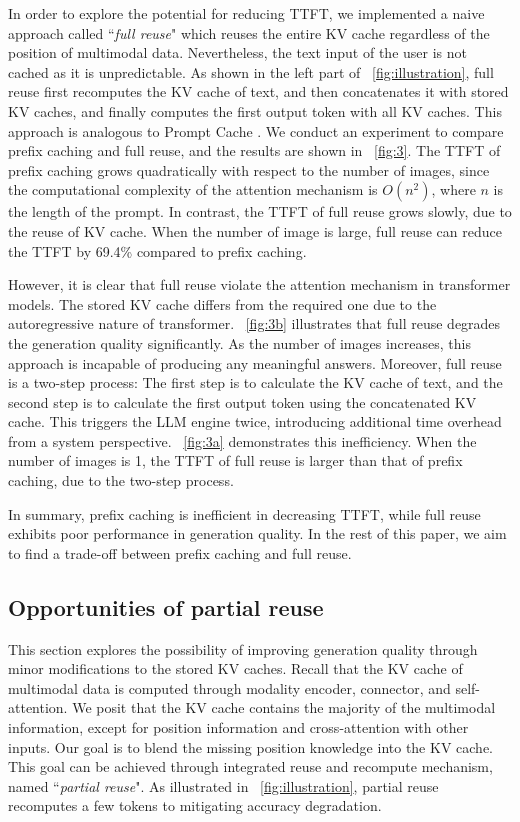 In order to explore the potential for reducing TTFT, we implemented a naive approach called ``\textit{full reuse}" which reuses the entire KV cache regardless of the position of multimodal data. Nevertheless, the text input of the user is not cached as it is unpredictable. As shown in the left part of \figurename~\ref{fig:illustration}, full reuse first recomputes the KV cache of text, and then concatenates it with stored KV caches, and finally computes the first output token with all KV caches. This approach is analogous to Prompt Cache \cite{gim2024prompt}. We conduct an experiment to compare prefix caching and full reuse, and the results are shown in \figurename~\ref{fig:3}. The TTFT of prefix caching grows quadratically with respect to the number of images, since the computational complexity of the attention mechanism is $O(n^2)$, where $n$ is the length of the prompt. In contrast, the TTFT of full reuse grows slowly, due to the reuse of KV cache. When the number of image is large, full reuse can reduce the TTFT by 69.4\% compared to prefix caching.

However, it is clear that full reuse violate the attention mechanism in transformer models. The stored KV cache differs from the required one due to the autoregressive nature of transformer. \figurename~\ref{fig:3b} illustrates that full reuse degrades the generation quality significantly. As the number of images increases, this approach is incapable of producing any meaningful answers. Moreover, full reuse is a two-step process: The first step is to calculate the KV cache of text, and the second step is to calculate the first output token using the concatenated KV cache. This triggers the LLM engine twice, introducing additional time overhead from a system perspective. \figurename~\ref{fig:3a} demonstrates this inefficiency. When the number of images is 1, the TTFT of full reuse is larger than that of prefix caching, due to the two-step process.

In summary, prefix caching is inefficient in decreasing TTFT, while full reuse exhibits poor performance in generation quality. In the rest of this paper, we aim to find a trade-off between prefix caching and full reuse.
\subsection{Opportunities of partial reuse}\label{sec:moti}
This section explores the possibility of improving generation quality through minor modifications to the stored KV caches. Recall that the KV cache of multimodal data is computed through modality encoder, connector, and self-attention. We posit that the KV cache contains the majority of the multimodal information, except for position information and cross-attention with other inputs. Our goal is to blend the missing position knowledge into the KV cache. This goal can be achieved through integrated reuse and recompute mechanism, named ``\textit{partial reuse}". As illustrated in \figurename~\ref{fig:illustration}, partial reuse recomputes a few tokens to mitigating accuracy degradation.


